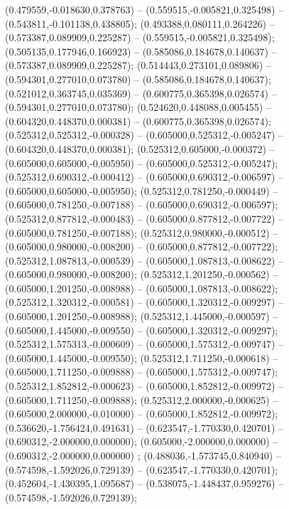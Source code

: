  (0.479559,-0.018630,0.378763) -- (0.559515,-0.005821,0.325498) -- (0.543811,-0.101138,0.438805);
 (0.493388,0.080111,0.264226) -- (0.573387,0.089909,0.225287) -- (0.559515,-0.005821,0.325498);
 (0.505135,0.177946,0.166923) -- (0.585086,0.184678,0.140637) -- (0.573387,0.089909,0.225287);
 (0.514443,0.273101,0.089806) -- (0.594301,0.277010,0.073780) -- (0.585086,0.184678,0.140637);
 (0.521012,0.363745,0.035369) -- (0.600775,0.365398,0.026574) -- (0.594301,0.277010,0.073780);
 (0.524620,0.448088,0.005455) -- (0.604320,0.448370,0.000381) -- (0.600775,0.365398,0.026574);
 (0.525312,0.525312,-0.000328) -- (0.605000,0.525312,-0.005247) -- (0.604320,0.448370,0.000381);
 (0.525312,0.605000,-0.000372) -- (0.605000,0.605000,-0.005950) -- (0.605000,0.525312,-0.005247);
 (0.525312,0.690312,-0.000412) -- (0.605000,0.690312,-0.006597) -- (0.605000,0.605000,-0.005950);
 (0.525312,0.781250,-0.000449) -- (0.605000,0.781250,-0.007188) -- (0.605000,0.690312,-0.006597);
 (0.525312,0.877812,-0.000483) -- (0.605000,0.877812,-0.007722) -- (0.605000,0.781250,-0.007188);
 (0.525312,0.980000,-0.000512) -- (0.605000,0.980000,-0.008200) -- (0.605000,0.877812,-0.007722);
 (0.525312,1.087813,-0.000539) -- (0.605000,1.087813,-0.008622) -- (0.605000,0.980000,-0.008200);
 (0.525312,1.201250,-0.000562) -- (0.605000,1.201250,-0.008988) -- (0.605000,1.087813,-0.008622);
 (0.525312,1.320312,-0.000581) -- (0.605000,1.320312,-0.009297) -- (0.605000,1.201250,-0.008988);
 (0.525312,1.445000,-0.000597) -- (0.605000,1.445000,-0.009550) -- (0.605000,1.320312,-0.009297);
 (0.525312,1.575313,-0.000609) -- (0.605000,1.575312,-0.009747) -- (0.605000,1.445000,-0.009550);
 (0.525312,1.711250,-0.000618) -- (0.605000,1.711250,-0.009888) -- (0.605000,1.575312,-0.009747);
 (0.525312,1.852812,-0.000623) -- (0.605000,1.852812,-0.009972) -- (0.605000,1.711250,-0.009888);
 (0.525312,2.000000,-0.000625) -- (0.605000,2.000000,-0.010000) -- (0.605000,1.852812,-0.009972);
 (0.536620,-1.756424,0.491631) -- (0.623547,-1.770330,0.420701) -- (0.690312,-2.000000,0.000000);
 (0.605000,-2.000000,0.000000) -- (0.690312,-2.000000,0.000000) ;
 (0.488036,-1.573745,0.840940) -- (0.574598,-1.592026,0.729139) -- (0.623547,-1.770330,0.420701);
 (0.452604,-1.430395,1.095687) -- (0.538075,-1.448437,0.959276) -- (0.574598,-1.592026,0.729139);
